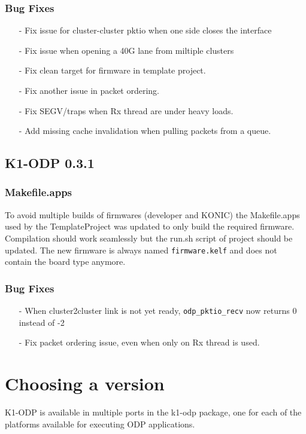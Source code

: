 \documentclass{trkalray}
\begin{document}
\subsubsection{Bug Fixes}
\begin{itemize}
\item[-]{Fix issue for cluster-cluster pktio when one side closes the
  interface}
\item[-]{Fix issue when opening a 40G lane from miltiple clusters}
\item[-]{Fix clean target for firmware in template project.}
\item[-]{Fix another issue in packet ordering.}
\item[-]{Fix SEGV/traps when Rx thread are under heavy loads.}
\item[-]{Add missing cache invalidation when pulling packets from a queue.}
\end{itemize}

\subsection{K1-ODP 0.3.1}

\subsubsection{Makefile.apps}

To avoid multiple builds of firmwares (developer and KONIC) the
Makefile.apps used by the TemplateProject was updated to only build
the required firmware.
Compilation should work seamlessly but the run.sh script of project
should be updated.
The new firmware is always named \texttt{firmware.kelf} and does not
contain the board type anymore.

\subsubsection{Bug Fixes}

\begin{itemize}
\item[-]{When cluster2cluster link is not yet ready, \texttt{odp\_pktio\_recv}
now returns 0 instead of -2}
\item[-]{Fix packet ordering issue, even when only on Rx thread is used.}
\end{itemize}

\newpage
\section{Choosing a version}
K1-ODP is available in multiple ports in the k1-odp package, one for
each of the platforms available for executing ODP applications.
\end{document}
